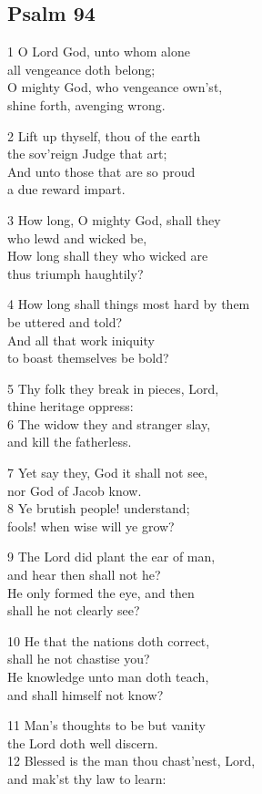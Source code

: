 \subsection*{Psalm 94}

1 O Lord God, unto whom alone\\
all vengeance doth belong;\\
O mighty God, who vengeance own’st,\\
shine forth, avenging wrong.

2 Lift up thyself, thou of the earth\\
the sov’reign Judge that art;\\
And unto those that are so proud\\
a due reward impart.

3 How long, O mighty God, shall they\\
who lewd and wicked be,\\
How long shall they who wicked are\\
thus triumph haughtily?

4 How long shall things most hard by them\\
be uttered and told?\\
And all that work iniquity\\
to boast themselves be bold?

5 Thy folk they break in pieces, Lord,\\
thine heritage oppress:\\
6 The widow they and stranger slay,\\
and kill the fatherless.

7 Yet say they, God it shall not see,\\
nor God of Jacob know.\\
8 Ye brutish people! understand;\\
fools! when wise will ye grow?

9 The Lord did plant the ear of man,\\
and hear then shall not he?\\
He only formed the eye, and then\\
shall he not clearly see?

10 He that the nations doth correct,\\
shall he not chastise you?\\
He knowledge unto man doth teach,\\
and shall himself not know?

11 Man’s thoughts to be but vanity\\
the Lord doth well discern.\\
12 Blessed is the man thou chast’nest, Lord,\\
and mak’st thy law to learn:

